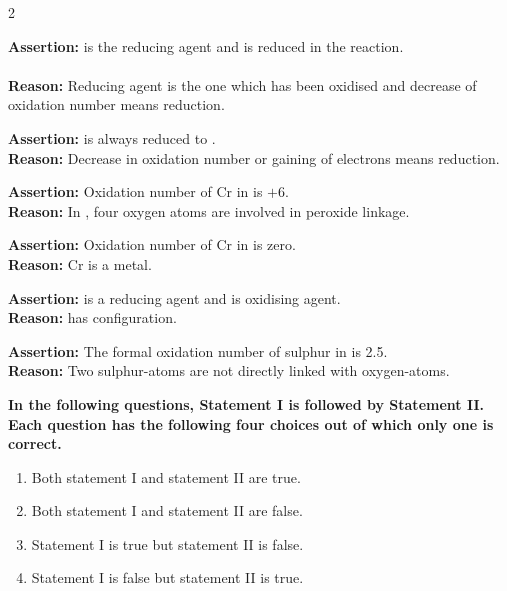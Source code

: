 \documentclass[10pt,a4paper]{article}
\begin{document}
\begin{multicols}{2}
\begin{questions}[start=1]
\item \textbf{Assertion:}  is the reducing agent and  is reduced in the reaction.\\
\\
\textbf{Reason:} Reducing agent is the one which has been oxidised and decrease of oxidation number means reduction.

\item \textbf{Assertion:}  is always reduced to .\\
\textbf{Reason:} Decrease in oxidation number or gaining of electrons means reduction.

\item \textbf{Assertion:} Oxidation number of Cr in  is $+6$.\\
\textbf{Reason:} In , four oxygen atoms are involved in peroxide linkage.

\item \textbf{Assertion:} Oxidation number of Cr in  is zero.\\
\textbf{Reason:} Cr is a metal.

\item \textbf{Assertion:}  is a reducing agent and  is oxidising agent.\\
\textbf{Reason:}  has  configuration.

\item \textbf{Assertion:} The formal oxidation number of sulphur in  is 2.5.\\
\textbf{Reason:} Two sulphur-atoms are not directly linked with oxygen-atoms.

\end{questions}
\end{multicols}

\noindent\textbf{In the following questions, Statement I is followed by Statement II. Each question has the following four choices out of which only one is correct.}

\begin{enumerate}[label=(\arabic*), leftmargin=2em, itemsep=1pt]
  \item Both statement I and statement II are true.
  \item Both statement I and statement II are false.
  \item Statement I is true but statement II is false.
  \item Statement I is false but statement II is true.
\end{enumerate}
\end{document}
